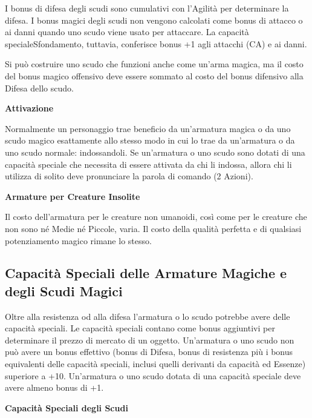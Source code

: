\documentclass[a4paper,11pt,twoside,openany]{book}
\begin{document}
\label{scudi-magici}

I bonus di difesa degli scudi sono cumulativi con l'Agilità per determinare la difesa. I bonus magici degli scudi non vengono calcolati come bonus di attacco o ai danni quando uno scudo viene usato per attaccare. La capacità specialeSfondamento, tuttavia, conferisce bonus +1 agli attacchi (CA) e ai danni.

Si può costruire uno scudo che funzioni anche come un'arma magica, ma il costo del bonus magico offensivo deve essere sommato al costo del bonus difensivo alla Difesa dello scudo.

\textbf{Attivazione}

Normalmente un personaggio trae beneficio da un'armatura magica o da uno scudo magico esattamente allo stesso modo in cui lo trae da un'armatura o da uno scudo normale: indossandoli. Se un'armatura o uno scudo sono dotati di una capacità speciale che necessita di essere attivata da chi li indossa, allora chi li utilizza di solito deve pronunciare la parola di comando (2 Azioni).

\textbf{Armature per Creature Insolite}

Il costo dell'armatura per le creature non umanoidi, così come per le creature che non sono né Medie né Piccole, varia. Il costo della qualità perfetta e di qualsiasi potenziamento magico rimane lo stesso.



\subsection{Capacità Speciali delle Armature Magiche e degli Scudi Magici}

\label{capacita-speciali-delle-armature-magiche-e-degli-scudi-magici}

Oltre alla resistenza od alla difesa l'armatura o lo scudo potrebbe avere delle capacità speciali. Le capacità speciali contano come bonus aggiuntivi per determinare il prezzo di mercato di un oggetto. Un'armatura o uno scudo non può avere un bonus effettivo (bonus di Difesa, bonus di resistenza più i bonus equivalenti delle capacità speciali, inclusi quelli derivanti da capacità ed Essenze) superiore a +10. Un'armatura o uno scudo dotata di una capacità speciale deve avere almeno bonus di +1.

\bigskip

\textbf{Capacità Speciali degli Scudi}

\medskip
\end{document}
